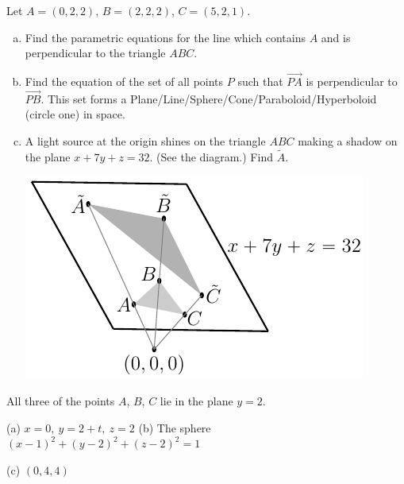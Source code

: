 \begin{question}[M200 2016D] %
Let $A=(0,2,2)$, $B=(2,2,2)$, $C=(5,2,1)$.
\begin{enumerate}[(a)]
\item
Find the parametric equations for the line which contains $A$
and is perpendicular to the triangle $ABC$.
\item
Find the equation of the set of all points $P$ such that $\overrightarrow{PA}$
is perpendicular to $\overrightarrow{PB}$. This set forms a
Plane/Line/Sphere/Cone/Paraboloid/Hyperboloid (circle one) in
space.
\item
A light source at the origin shines on the triangle $ABC$ making
a shadow on the plane $x+7y+z=32$. (See the diagram.) Find $\tilde A$.

\begin{center}
     \includegraphics{fig/OE16D_1.pdf}
\end{center}


\end{enumerate}
\end{question}

\begin{hint}
All three of the points $A$, $B$, $C$ lie in the plane $y=2$.
\end{hint}

\begin{answer}
(a) $x=0,\ y=2+t,\ z=2$\qquad
(b) The sphere $(x-1)^2 +(y-2)^2+(z-2)^2 = 1$

(c) $(0,4,4)$
\end{answer}

